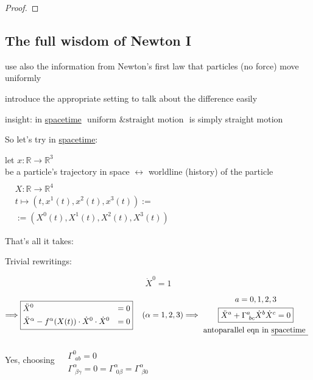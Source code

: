 \documentclass[10pt, twoside]{amsart}
\begin{document}
\begin{multicols*}{2}
\begin{proof}
\end{proof}

\subsection{The full wisdom of Newton I}

use also the information from Newton's first law that particles (no force) move uniformly 

introduce the appropriate setting to talk about the difference easily

insight: in \underline{spacetime} $\boxed{ \text{ uniform \& straight motion }}$ is simply straight motion

So let's try in \underline{spacetime}: 

let $x: \mathbb{R} \to \mathbb{R}^3$ \\
\phantom{\quad } be a particle's trajectory in space $\longleftrightarrow $ worldline (history) of the particle $\begin{aligned} & \quad \\
  & X : \mathbb{R} \to \mathbb{R}^4  \\
  & t\mapsto (t, x^1(t), x^2(t),x^3(t)) := \\
  & := (X^0(t), X^1(t),X^2(t),X^3(t)) \end{aligned}$

That's all it takes:

Trivial rewritings:

\[
\dot{X}^0 =1
\]

\[
\Longrightarrow \boxed{ \begin{aligned}
  & \ddot{X}^0 & = 0 \\ 
  & \ddot{X}^{\alpha} - f^{\alpha}(X(t))\cdot \dot{X}^0 \cdot \dot{X}^0 & =0 
\end{aligned} } \quad \, (\alpha = 1,2,3)  \Longrightarrow \begin{gathered}
  a = 0,1,2,3 \\
  \boxed{ \ddot{X}^a + \Gamma^a_{ \, \, bc}\dot{X}^b \dot{X}^c = 0 } \\
  \text{ antoparallel eqn in \underline{spacetime } }
\end{gathered}
\]

Yes, choosing $\begin{aligned} & \quad \\
  & \Gamma^0_{ \, \, ab} = 0 \\
  & \Gamma^{\alpha}_{ \, \, \beta \gamma} = 0 =\Gamma^{\alpha}_{\,\, 0\beta} = \Gamma^{\alpha}_{ \, \, \beta 0}\end{aligned}$


\end{multicols*}
\end{document}
